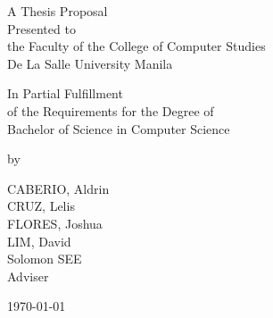 %
%
%                 

\begin{titlepage}
\centering



\vspace{1.75cm}
A Thesis Proposal\\
Presented to\\
the Faculty of the College of Computer Studies\\
De La Salle University Manila

\vspace{1.75cm}
In Partial Fulfillment\\
of the Requirements for the Degree of\\

Bachelor of Science in Computer Science

\vspace{1.75cm}
by\\
\vspace{1cm}

CABERIO, Aldrin  \\
CRUZ, Lelis  \\
FLORES, Joshua  \\
LIM, David  \\

\vspace{1.75cm}
Solomon SEE \\
Adviser

\vspace{1.75cm}
\today
\end{titlepage}
